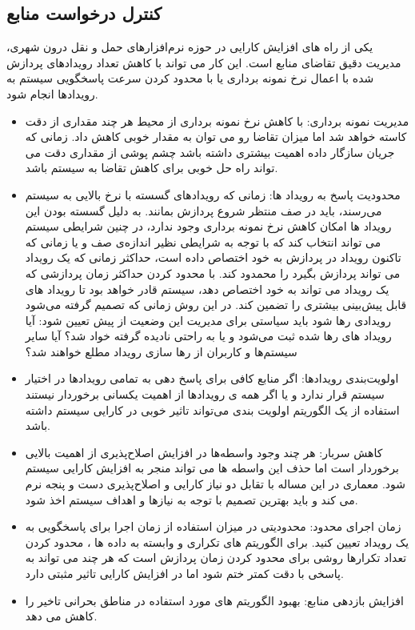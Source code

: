 \subsection{کنترل درخواست منابع}

یکی از راه های افزایش کارایی در حوزه نرم‌افزارهای حمل و نقل درون شهری، مدیریت دقیق تقاضای منابع است. این کار می تواند با کاهش تعداد رویدادهای پردازش شده با اعمال نرخ نمونه برداری یا با محدود کردن سرعت پاسخگویی سیستم به رویدادها انجام شود.
\begin{itemize}
\item
مدیریت نمونه برداری: با کاهش نرخ نمونه برداری از محیط هر چند مقداری از دقت کاسته خواهد شد اما میزان تقاضا رو می توان به مقدار خوبی کاهش داد. زمانی که جریان سازگار داده اهمیت بیشتری داشته باشد چشم پوشی از مقداری دقت می تواند راه حل خوبی برای کاهش تقاضا به سیستم باشد.
\item
محدودیت پاسخ به رویداد ها: زمانی که رویداد‌های گسسته با نرخ بالایی به سیستم می‌رسند،‌ باید در صف منتظر شروع پردازش بمانند. به دلیل گسسته بودن این رویداد ها امکان کاهش نرخ نمونه برداری وجود ندارد، در چنین شرایطی سیستم می تواند انتخاب کند که با توجه به شرایطی نظیر اندازه‌ی صف و یا زمانی که تاکنون رویداد در پردازش به خود اختصاص داده است، ‌حداکثر زمانی که یک رویداد می تواند پردازش بگیرد را محمدود کند. با محدود کردن حداکثر زمان پردازشی که یک رویداد می تواند به خود اختصاص دهد،‌ سیستم قادر خواهد بود تا رویداد های قابل پیش‌بینی بیشتری را تضمین کند. در این روش زمانی که تصمیم گرفته می‌شود رویدادی رها شود باید سیاستی برای مدیریت این وضعیت از پیش تعیین شود: آیا رویداد های رها شده ثبت می‌شود و یا به راحتی نادیده گرفته خواد شد؟ آیا سایر سیستم‌ها و کاربران از رها سازی رویداد مطلع خواهند شد؟
\item 
اولویت‌بندی رویداد‌ها: اگر منابع کافی برای پاسخ دهی به تمامی رویداد‌ها در اختیار سیستم قرار ندارد و یا اگر همه ی رویداد‌ها از اهمیت یکسانی برخوردار نیستند استفاده از یک الگوریتم اولویت بندی می‌تواند تاثیر خوبی در کارایی سیستم داشته باشد.
\item
کاهش سربار: هر چند وجود واسطه‌ها در افزایش اصلاح‌پذیری از اهمیت بالایی برخوردار است اما حذف این واسطه ها می تواند منجر به افزایش کارایی سیستم شود. معماری در این مساله با تقابل دو نیاز کارایی و اصلاح‌پذیری دست و پنجه نرم می کند و باید بهترین تصمیم با توجه به نیازها و اهداف سیستم اخذ شود.
\item
زمان اجرای محدود: محدودیتی در میزان استفاده از زمان اجرا برای پاسخگویی به یک رویداد تعیین کنید. برای الگوریتم های تکراری و وابسته به داده ها ، محدود کردن تعداد تکرارها روشی برای محدود کردن زمان پردازش است که هر چند می تواند به پاسخی با دقت کمتر ختم شود اما در افزایش کارایی تاثیر مثبتی دارد.
\item
افزایش بازدهی منابع: بهبود الگوریتم های مورد استفاده در مناطق بحرانی
تاخیر را کاهش می دهد.
\end{itemize}
